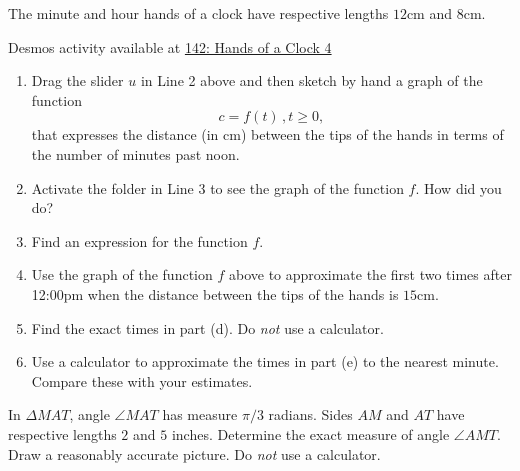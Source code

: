 \documentclass{ximera}
\begin{document}
\begin{question} \label{Q9eergFDhgL}
The minute and hour hands of a clock have respective lengths $12$cm and $8$cm. 

\begin{onlineOnly}
    \begin{center}
\end{center}
\end{onlineOnly}

Desmos activity available at \href{https://www.desmos.com/calculator/sl0k5pvb6h}{142: Hands of a Clock 4}

\begin{enumerate}
\item Drag the slider $u$ in Line 2 above and then sketch by hand a graph of the function
\[
    c = f(t) \, , t\geq 0 ,
\]
that expresses the distance (in cm) between the tips of the hands in terms of the number of minutes past noon.

\item Activate the folder in Line 3 to see the graph of the function $f$. How did you do?

\item Find an expression for the function $f$.

\item Use the graph of the function $f$ above to approximate the first two times after 12:00pm when the distance between the tips of the hands is $15$cm.

\item Find the exact times in part (d). Do \emph{not} use a calculator.

\item Use a calculator to approximate the times in part (e) to the nearest minute. Compare these with your estimates.
\end{enumerate}

\end{question}


\begin{question} \label{Q898dfbfdgdsg}
In $\Delta MAT$, angle $\angle MAT$ has measure $\pi/3$ radians. Sides $AM$ and $AT$ have respective lengths $2$ and $5$ inches. Determine the exact measure of angle $\angle AMT$. Draw a reasonably accurate picture. Do \emph{not} use a calculator.
\end{question}
\end{document}
